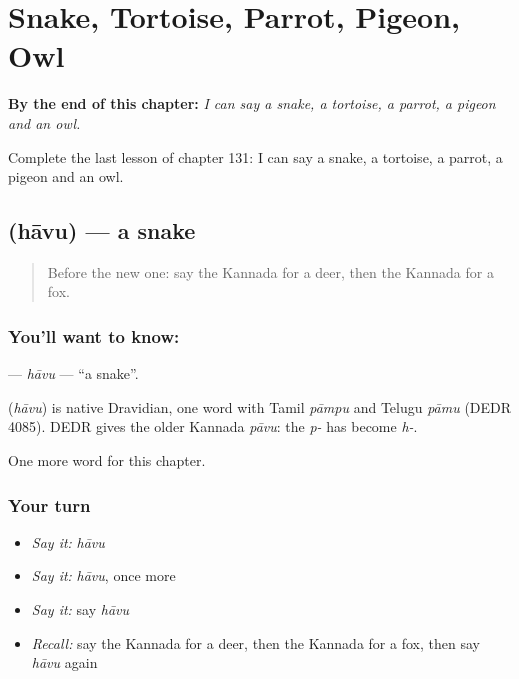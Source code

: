 
\chapter{Snake, Tortoise, Parrot, Pigeon, Owl}
\label{ch:ka-snake-tortoise-parrot-pigeon-owl}

\begin{chapteropening}
\textbf{By the end of this chapter:} \emph{I can say a snake, a tortoise, a parrot, a pigeon and an owl.}

Complete the last lesson of chapter 131: I can say a snake, a tortoise, a parrot, a pigeon and an owl.
\end{chapteropening}

\section[\texorpdfstring{\kn{ಹಾವು} (hāvu)}{ಹಾವು (hāvu)}]{ (hāvu) — a snake}

\label{lesson:KA-C131-havu}



\begin{quote}
Before the new one: say the Kannada for a deer, then the Kannada for a fox.
\end{quote}

\subsection*{You'll want to know: }
\textbf{} — \emph{hāvu} — \textquotedblleft{}a snake\textquotedblright{}.

\begin{cousinweb}
\textbf{} (\emph{hāvu}) is native Dravidian, one word with Tamil \emph{pāmpu} and Telugu \emph{pāmu} (DEDR 4085). DEDR gives the older Kannada \emph{pāvu}: the \emph{p-} has become \emph{h-}.
\end{cousinweb}

\begin{grammarlens}[title={What you've built}]
One more word for this chapter.
\end{grammarlens}

\subsection*{Your turn}
\begin{itemize}
\raggedright
  \item \emph{Say it:} \emph{hāvu}
  \item \emph{Say it:} \emph{hāvu}, once more
  \item \emph{Say it:} say \emph{hāvu}
  \item \emph{Recall:} say the Kannada for a deer, then the Kannada for a fox, then say \emph{hāvu} again
\end{itemize}

